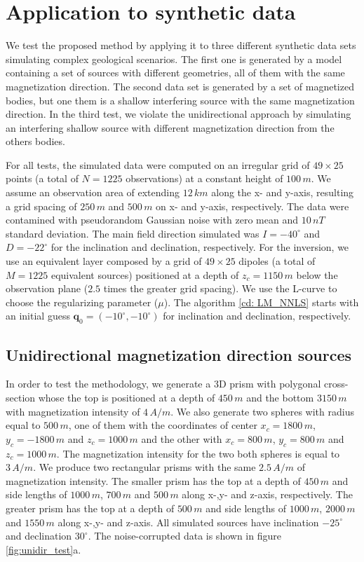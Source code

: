 \section{Application to synthetic data}
\label{sec:synt_tests}

We test the proposed method by applying it to three different synthetic data sets simulating complex geological scenarios. The first one is generated by a model containing a set of sources with different geometries, all of them with the same magnetization direction. The second data set is generated by a set of magnetized bodies, but one them is a shallow interfering source with the same magnetization direction. In the third test, we violate the unidirectional approach by simulating an interfering shallow source with different magnetization direction from the others bodies.

For all tests, the simulated data were computed on an irregular grid of $49 \times 25$ points (a total of $N = 1225$ observations) at a constant height of $100 \, m$.  We assume an observation area of extending $12 \, km$ along the x- and y-axis, resulting a grid spacing of $250 \, m$ and $500 \, m$ on x- and y-axis, respectively. The data were contamined with pseudorandom Gaussian noise with zero mean and $10 \, nT$ standard deviation. The main field direction simulated was $I= -40^\circ$ and $D= -22^\circ$ for the inclination and declination, respectively. For the inversion, we use an equivalent layer composed by a grid of $49 \times 25$ dipoles (a total of $M = 1225$ equivalent sources) positioned at a depth of $z_c = 1150 \, m$ below the observation plane ($2.5$ times the greater grid spacing). We use the L-curve to choose the regularizing parameter ($\mu$). The algorithm \ref{cd: LM_NNLS} starts with an initial guess $\mathbf{q}_0 = (-10^\circ,-10^\circ)$ for inclination and declination, respectively.

\subsection{Unidirectional magnetization direction sources}
 
In order to test the methodology, we generate a 3D prism with polygonal cross-section whose the top is positioned at a depth of $450 \, m$ and the bottom $3150 \, m$ with magnetization intensity of $4 \, A/m$. We also generate two spheres with radius equal to $500 \, m$, one of them with the coordinates of center $x_c = 1800 \, m $, $y_c = -1800 \, m $ and $z_c = 1000 \, m$ and the other with $x_c = 800 \, m$, $y_c = 800 \, m$ and $z_c= 1000 \, m$. The magnetization intensity for the two both spheres is equal to  $3 \, A/m$. We produce two rectangular prisms with the same $2.5 \, A/m$ of magnetization intensity. The smaller prism has the top at a depth of $450 \, m$ and side lengths of $1000 \, m$, $700 \, m$ and $500 \, m$ along x-,y- and z-axis, respectively. The greater prism has the top at a depth of $500 \, m$ and side lengths of $1000 \, m$, $2000 \, m$ and $1550 \, m$ along x-,y- and z-axis. All simulated sources have inclination $-25^\circ$ and declination $30^\circ$. The noise-corrupted data is shown in figure \ref{fig:unidir_test}a. 

